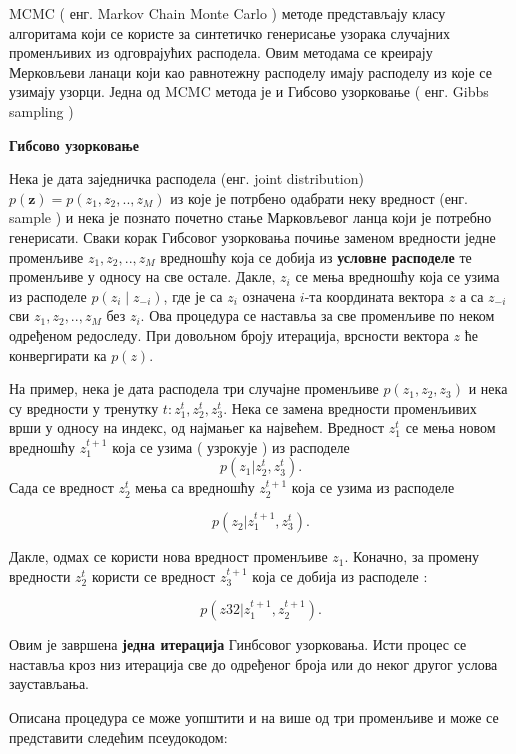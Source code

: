 \begin{de}
MCMC ( енг. Markov Chain Monte Carlo ) методе представљају класу алгоритама који се користе за синтетичко генерисање узорака случајних променљивих из одговрајућих расподела. Овим методама се креирају Мерковљеви ланаци који као равнотежну расподелу имају расподелу из које се узимају узорци. Једна од MCMC метода је и Гибсово узорковање ( енг. Gibbs sampling )
\end{de}


\textbf{Гибсово узорковање} 

Нека је дата заједничка расподела (енг. joint distribution) $p(\textbf{z})= p(z_1,z_2,..,z_M)$ из које је потрбено одабрати неку вредност (енг. sample ) и нека је познато  почетно стање Марковљевог ланца који је потребно генерисати. Сваки корак Гибсовог узорковања почиње заменом  вредности једне променљиве  $z_1,z_2,..,z_M$ вредношћу која се добија из \textbf{условне расподеле} те променљиве у односу на све остале.  Дакле, $z_i$ се мења вредношћу која се узима из расподеле $p(z_i \mid z_{-i})$, где је са $z_i$ означена $i$-та координата вектора $z$  а са   $z_{-i}$ сви $z_1,z_2,..,z_M$ без $z_i$. Ова процедура се наставља за све променљиве по неком одређеном редоследу. При довољном броју итерација, врсности вектора $z$ ће конвергирати ка $p(z)$.

На пример, нека је дата расподела три случајне променљиве $p(z_1,z_2,z_3)$ и нека су вредности у тренутку $t : z_1^{t},z_2^{t},z_3^{t}$. Нека се замена вредности променљивих врши у односу на индекс, од најмањег ка највећем. Вредност $z_1^{t}$ се мења новом вредношћу  $z_1^{t+1}$ која се узима ( узрокује ) из расподеле 
$$
p(z_1|z_2^{t},z_3^{t}).
$$
Сада се вредност $z_2^{t}$ мења са вредношћу  $z_2^{t+1}$ која се узима из расподеле 

$$
p(z_2|z_1^{t+1},z_3^{t}).
$$

Дакле, одмах се користи нова вредност променљиве $z_1$. Коначно, за промену вредности $z_2^{t}$ користи се вредност $z_3^{t+1}$ која се добија из расподеле :

$$
p(z32|z_1^{t+1},z_2^{t+1}).
$$

Овим је завршена \textbf{једна итерација} Гинбсовог узорковања. Исти процес се наставља кроз низ итерација све до одређеног броја или до неког другог услова заустављања.

Описана процедура се може уопштити и на више од три променљиве и може се представити следећим псеудокодом:

